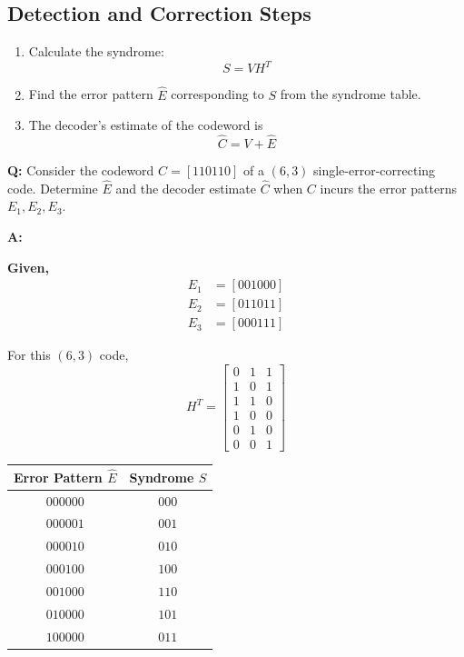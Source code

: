 \documentclass[11pt,a4paper]{book}
\renewcommand{\arraystretch}{1.4}
\newcounter{qna}[chapter]
\renewcommand{\theqna}{\thechapter.\arabic{qna}}
\newenvironment{questionanswerbox}[1][Example]{%
    \refstepcounter{qna}
    \begin{tcolorbox}[
        enhanced,
        breakable,
        colback=softlavender!10,
        colframe=softlavender!200,
        title={#1~\theqna},
        fonttitle=\bfseries,
        coltitle=white,
        colbacktitle=softlavender!200,
        sharp corners,
        boxrule=1pt,
        left=8pt,
        right=8pt,
        top=6pt,
        bottom=6pt
    ]
}{\end{tcolorbox}}
\begin{document}
\subsection{Detection and Correction Steps}
\begin{enumerate}
    \item Calculate the syndrome:
    \[
    S=VH^T
    \]
    \item Find the error pattern \(\hat E\) corresponding to \(S\) from the syndrome table.
    \item The decoder's estimate of the codeword is
    \[
    \hat C=V+\hat E
    \]
\end{enumerate}

\begin{questionanswerbox}[(6,3) Error Detection and Correction Example]
\textbf{Q:} Consider the codeword \(C=[110110]\) of a \((6,3)\) single-error-correcting code. Determine \(\hat E\) and the decoder estimate \(\hat C\) when \(C\) incurs the error patterns \(E_1,E_2,E_3\).

\textbf{A:}

\textbf{Given,}
\begin{align*}
E_1 &= [001000]\\
E_2 &= [011011]\\
E_3 &= [000111]
\end{align*}

For this \((6,3)\) code,
\[
H^T=
\begin{bmatrix}
0&1&1\\
1&0&1\\
1&1&0\\
1&0&0\\
0&1&0\\
0&0&1
\end{bmatrix}
\]

\begin{center}
\renewcommand{\arraystretch}{1.15}
\setlength{\tabcolsep}{8pt}
\begin{tabular}{|c|c|}
\hline
\textbf{Error Pattern \(\hat E\)} & \textbf{Syndrome \(S\)} \\
\hline
\(000000\) & \(000\) \\
\hline
\(000001\) & \(001\) \\
\hline
\(000010\) & \(010\) \\
\hline
\(000100\) & \(100\) \\
\hline
\(001000\) & \(110\) \\
\hline
\(010000\) & \(101\) \\
\hline
\(100000\) & \(011\) \\
\hline
\end{tabular}
\end{center}


\end{questionanswerbox}
\end{document}
